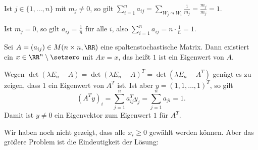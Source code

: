 \begin{beweis}
	Ist $j \in \{1,\dots,n\}$ mit $m_j \neq 0$, so gilt $\sum_{i=1}^{n} a_{ij} = \sum_{W_j \leadsto W_i} \frac{1}{m_j} = \frac{m_j}{m_j} = 1$.
	
	Ist $m_j = 0$, so gilt $a_{ij} = \frac{1}{n}$ für alle $i$, also $\sum_{i=1}^{n} a_{ij} = n \cdot \frac{1}{n} = 1$. 
\end{beweis}

\begin{lemma}
	\label{lemma:13.5}
	Sei $A = (a_{ij}) \in M(n \times n, \RR)$ eine spaltenstochastische Matrix.
	Dann existiert ein $x \in \RR^n \setminus \setzero$ mit $Ax = x$, das heißt $1$ ist ein Eigenwert von $A$.
\end{lemma}

\begin{beweis}
	Wegen $\det(\lambda E_n - A) = \det(\lambda E_n - A)^T = \det(\lambda E_n - A^T)$ genügt es zu zeigen, dass $1$ ein Eigenwert von $A^T$ ist.
	Ist aber $y = (1,1,\dots,1)^T$, so gilt 
	\[
		(A^Ty)_i = \sum_{j=1}^{n} a_{ij}^T y_j = \sum_{j=1}^{n} a_{ji} = 1.
	\]
	Damit ist $y \neq 0$ ein Eigenvektor zum Eigenwert $1$ für $A^T$. 
\end{beweis}

Wir haben noch nicht gezeigt, dass alle $x_i \geq 0$ gewählt werden können.
Aber das größere Problem ist die Eindeutigkeit der Lösung:

